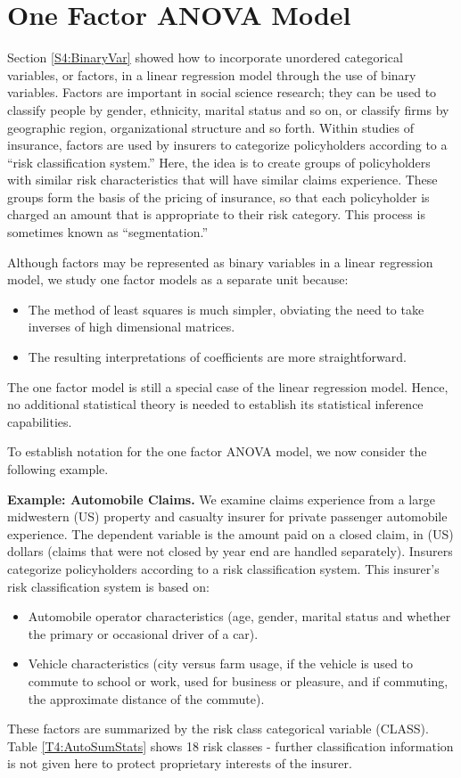 \section{One Factor ANOVA Model}

Section \ref{S4:BinaryVar} showed how to incorporate unordered
categorical variables, or factors, in a linear regression model
through the use of binary variables. Factors are important in social
science research; they can be used to classify people by gender,
ethnicity, marital status and so on, or classify firms by geographic
region, organizational structure and so forth. Within studies of
insurance, factors are used by insurers to categorize policyholders
according to a ``risk classification system.'' Here, the idea is to
create groups of policyholders with similar risk characteristics
that will have similar claims experience. These groups form the
basis of the pricing of insurance, so that each policyholder is
charged an amount that is appropriate to their risk category. This
process is sometimes known as ``segmentation.''

Although factors may be represented as binary variables in a linear
regression model, we study one factor models as a separate unit
because:
\begin{itemize}
\item The method of least squares is much simpler, obviating the need to take inverses of high dimensional matrices.
\item The resulting interpretations of coefficients are more straightforward.
\end{itemize}
The one factor model is still a special case of the linear
regression model. Hence, no additional statistical theory is needed
to establish its statistical inference capabilities.

To establish notation for the one factor ANOVA model, we now
consider the following example.

\linejed



\textbf{Example: Automobile Claims.}
We examine claims experience from a large midwestern (US) property
and casualty insurer for private passenger automobile experience.
The dependent variable is the amount paid on a closed claim, in (US)
dollars (claims that were not closed by year end are handled
separately). Insurers categorize policyholders according to a risk
classification system. This insurer's risk classification system is
based on:
\begin{itemize}
\item Automobile operator characteristics (age, gender, marital
  status and whether the primary or occasional driver of a car).
\item Vehicle characteristics (city versus farm usage, if the vehicle is used to commute to school or
    work, used for business or pleasure, and if commuting, the
    approximate distance of the commute).
\end{itemize}
These factors are summarized by the risk class categorical variable
(CLASS). Table \ref{T4:AutoSumStats} shows 18 risk classes - further
classification information is not given here to protect proprietary
interests of the insurer.

